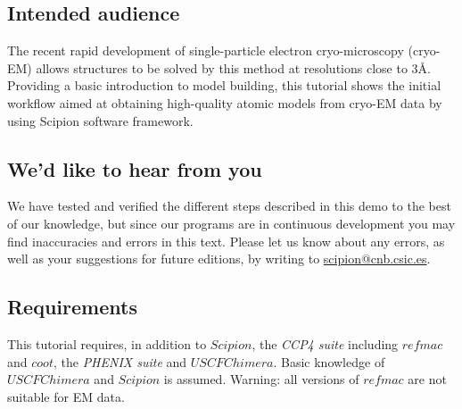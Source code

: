 \documentclass[12pt]{article} %
\begin{document}


\subsection*{Intended audience}
The recent rapid development of single-particle electron cryo-microscopy (cryo-EM) allows structures to be solved by this method at resolutions close to 3\AA.  Providing a basic introduction to model building, this tutorial shows the initial workflow aimed at obtaining high-quality atomic models from cryo-EM data by using Scipion software framework. %


\subsection*{We'd like to hear from you}

We have tested and verified the different steps described in this demo
to the best of our knowledge, but since our programs are in continuous
development you may find inaccuracies and errors in this text. Please
let us know about any errors, as well as your suggestions for
future editions, by writing to
\href{mailto:scipion@cnb.csic.es}{scipion@cnb.csic.es}.


\subsection*{Requirements}

This tutorial requires, in addition to $Scipion$,  the \textit{CCP4 suite} including $refmac$ and $coot$, the \textit{PHENIX suite} and $USCF Chimera$. Basic knowledge of $USCF Chimera$ and $Scipion$ is assumed. Warning: all versions of $refmac$ are not suitable for EM data.

\newpage



\tableofcontents %

\newpage %
\end{document}
